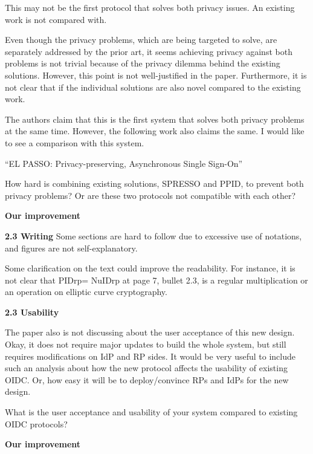 \documentclass[letterpaper,onecolumn,10pt]{article}
\begin{document}
This may not be the first protocol that solves both privacy issues. An existing work is not compared with.

Even though the privacy problems, which are being targeted to solve, are separately addressed by the prior art, it seems achieving privacy against both problems is not trivial because of the privacy dilemma behind the existing solutions. However, this point is not well-justified in the paper. Furthermore, it is not clear that if the individual solutions are also novel compared to the existing work.


The authors claim that this is the first system that solves both privacy problems at the same time. However, the following work also claims the same. I would like to see a comparison with this system.

``EL PASSO: Privacy-preserving, Asynchronous Single Sign-On''


How hard is combining existing solutions, SPRESSO and PPID, to prevent both privacy problems? Or are these two protocols not compatible with each other?

\vspace{1mm}\noindent\textbf{Our improvement}

\vspace{1mm}\noindent\textbf{2.3 Writing}
Some sections are hard to follow due to excessive use of notations, and figures are not self-explanatory.

Some clarification on the text could improve the readability. For instance, it is not clear that PIDrp= NuIDrp at page 7, bullet 2.3, is a regular multiplication or an operation on elliptic curve cryptography.


\noindent\textbf{2.3 Usability}

The paper also is not discussing about the user acceptance of this new design.
Okay, it does not require major updates to build the whole system, but still requires modifications on IdP and RP sides.
It would be very useful to include such an analysis about how the new protocol affects the usability of existing OIDC.
Or, how easy it will be to deploy/convince RPs and IdPs for the new design.

What is the user acceptance and usability of your system compared to existing OIDC protocols?

\vspace{1mm}\noindent\textbf{Our improvement}
\end{document}
